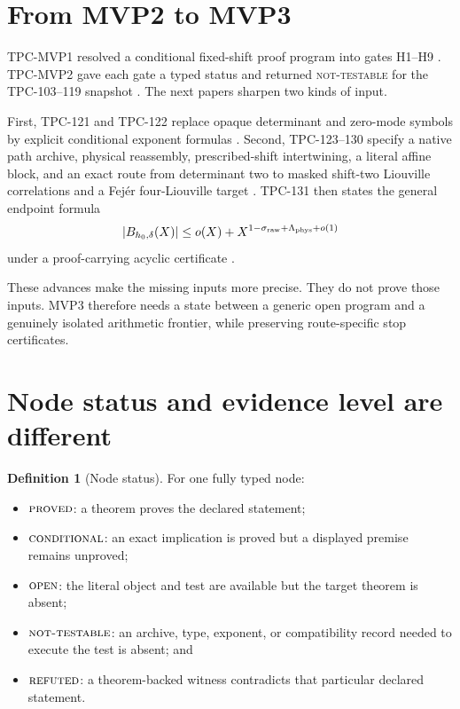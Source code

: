 \documentclass[11pt]{article}
\theoremstyle{definition}
\newtheorem{definition}[theorem]{Definition}
\theoremstyle{remark}
\newcommand{\NT}{\textnormal{\textsc{not-testable}}}
\newcommand{\OPEN}{\textnormal{\textsc{open}}}
\newcommand{\PROVED}{\textnormal{\textsc{proved}}}
\newcommand{\COND}{\textnormal{\textsc{conditional}}}
\newcommand{\REFUTED}{\textnormal{\textsc{refuted}}}
\begin{document}
\section{From MVP2 to MVP3}

TPC-MVP1 resolved a conditional fixed-shift proof program into gates
H1--H9 \citep{WangMVP1}.  TPC-MVP2 gave each gate a typed status and
returned \textsc{not-testable} for the TPC-103--119 snapshot
\citep{WangTPC120}.  The next papers sharpen two kinds of input.

First, TPC-121 and TPC-122 replace opaque determinant and zero-mode
symbols by explicit conditional exponent formulas
\citep{WangTPC121,WangTPC122}.  Second, TPC-123--130 specify a native
path archive, physical reassembly, prescribed-shift intertwining, a
literal affine block, and an exact route from determinant two to
masked shift-two Liouville correlations and a Fej\'er
four-Liouville target
\citep{WangTPC123,WangTPC124,WangTPC125,
WangTPC126,WangTPC127,WangTPC128,WangTPC129,WangTPC130}.  TPC-131
then states the general endpoint formula
\[
 |B_{h_0,\delta}(X)|
 \le o(X)+
 X^{1-\sigma_{\rm raw}+\Lambda_{\rm phys}+o(1)}
\]
under a proof-carrying acyclic certificate
\citep{WangTPC131}.

These advances make the missing inputs more precise.  They do not
prove those inputs.  MVP3 therefore needs a state between a generic
open program and a genuinely isolated arithmetic frontier, while
preserving route-specific stop certificates.

\section{Node status and evidence level are different}

\begin{definition}[Node status]
\label{def:node}
For one fully typed node:
\begin{itemize}[leftmargin=2em]
\item \(\PROVED\): a theorem proves the declared statement;
\item \(\COND\): an exact implication is proved but a displayed
  premise remains unproved;
\item \(\OPEN\): the literal object and test are available but the
  target theorem is absent;
\item \(\NT\): an archive, type, exponent, or compatibility record
  needed to execute the test is absent; and
\item \(\REFUTED\): a theorem-backed witness contradicts that
  particular declared statement.
\end{itemize}
\end{definition}
\end{document}
